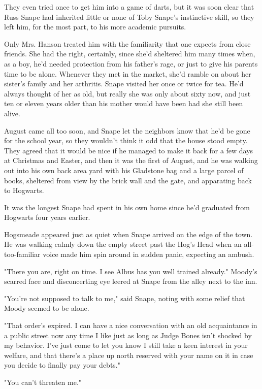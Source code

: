 They even tried once to get him into a game of darts, but it was soon clear that Russ Snape had inherited little or none of Toby Snape's instinctive skill, so they left him, for the most part, to his more academic pursuits.

Only Mrs. Hanson treated him with the familiarity that one expects from close friends. She had the right, certainly, since she'd sheltered him many times when, as a boy, he'd needed protection from his father's rage, or just to give his parents time to be alone. Whenever they met in the market, she'd ramble on about her sister's family and her arthritis. Snape visited her once or twice for tea. He'd always thought of her as old, but really she was only about sixty now, and just ten or eleven years older than his mother would have been had she still been alive.

August came all too soon, and Snape let the neighbors know that he'd be gone for the school year, so they wouldn't think it odd that the house stood empty. They agreed that it would be nice if he managed to make it back for a few days at Christmas and Easter, and then it was the first of August, and he was walking out into his own back area yard with his Gladstone bag and a large parcel of books, sheltered from view by the brick wall and the gate, and apparating back to Hogwarts.

It was the longest Snape had spent in his own home since he'd graduated from Hogwarts four years earlier.

Hogsmeade appeared just as quiet when Snape arrived on the edge of the town. He was walking calmly down the empty street past the Hog's Head when an all-too-familiar voice made him spin around in sudden panic, expecting an ambush.

"There you are, right on time. I see Albus has you well trained already." Moody's scarred face and disconcerting eye leered at Snape from the alley next to the inn.

"You're not supposed to talk to me," said Snape, noting with some relief that Moody seemed to be alone.

"That order's expired. I can have a nice conversation with an old acquaintance in a public street now any time I like just as long as Judge Bones isn't shocked by my behavior. I've just come to let you know I still take a keen interest in your welfare, and that there's a place up north reserved with your name on it in case you decide to finally pay your debts."

"You can't threaten me."

